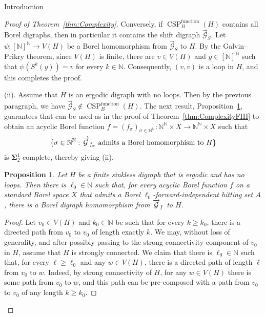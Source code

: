 \documentclass[psamsfonts]{amsart}
\newtheorem{prop}[thm]{Proposition}
\theoremstyle{definition}
\newcommand{\N}{\mathbb N}
\theoremstyle{remark}
\numberwithin{equation}{section}
\newcommand\mbf{\mathbf}
\begin{document}
\begin{section}{Introduction}
\begin{proof}[Proof of Theorem~\ref{thm:Complexity}]
Conversely, if $\operatorname{CSP}^{\operatorname{function}}_B(H)$ contains all Borel digraphs, then in particular it contains the shift digraph $\overrightarrow{\mathcal{G}}_S$.
Let $\psi:[\N]^\N\to V(H)$ be a Borel homomorphism from $\overrightarrow{\mathcal{G}}_S$ to $H$.
By the Galvin--Prikry theorem, since $V(H)$ is finite, there are $v\in V(H)$ and $y\in [\N]^\N$ such that $\psi(S^k(y))=v$ for every $k\in \N$.
Consequently, $(v,v)$ is a loop in $H$, and this completes the proof.

\medskip

(ii). Assume that $H$ is an ergodic digraph with no loops.
Then by the previous paragraph, we have $\overrightarrow{\mathcal{G}}_S\not\in \operatorname{CSP}^{\operatorname{function}}_B(H)$.
The next result, Proposition~\ref{pr:FlexibleLCL}, guarantees that \cite[Theorem~3.1]{fsv2024} can be used as in the proof of Theorem~\ref{thm:ComplexityFIH} to obtain an acyclic Borel function $f=(f_\sigma)_{\sigma\in{\N^\N}}:\N^\N\times X\to \N^\N\times X$ such that 
\begin{equation}\label{eq:CompleteErgodic}
    \{\sigma\in \mathbb{N}^\mathbb{N}:  \overrightarrow{\mathcal{G}}_{f_\sigma} \ \text{\normalfont admits a Borel homomorphism to } H\}
\end{equation}
is $\mbf{\Sigma}^1_2$-complete, thereby giving (ii).

    \begin{prop}\label{pr:FlexibleLCL}
        Let $H$ be a finite sinkless digraph that is ergodic and has no loops.
        Then there is $\ell_0\in \N$ such that, for every acyclic Borel function $f$ on a standard Borel space $X$ that admits a Borel $\ell_0$-forward-independent hitting set $A$, there is a Borel digraph homomorphism from $\overrightarrow{\mathcal{G}}_f$ to $H$.    
    \end{prop}
    \begin{proof}
        Let $v_0\in V(H)$ and $k_0\in \N$ be such that for every $k\ge k_0$, there is a directed path from $v_0$ to $v_0$ of length exactly $k$.
        We may, without loss of generality, and after possibly passing to the strong connectivity component of $v_0$ in $H$, assume that $H$ is strongly connected.
        We claim that there is $\ell_0\in \N$ such that, for every $\ell\ge \ell_0$ and any $w \in V(H)$, there is a directed path of length $\ell$ from $v_0$ to $w$.
        Indeed, by strong connectivity of $H$, for any $w\in V(H)$ there is some path from $v_0$ to $w$, and this path can be pre-composed with a path from $v_0$ to $v_0$ of any length $k\ge k_0$.


\end{proof}
\end{proof}
\end{section}
\end{document}
